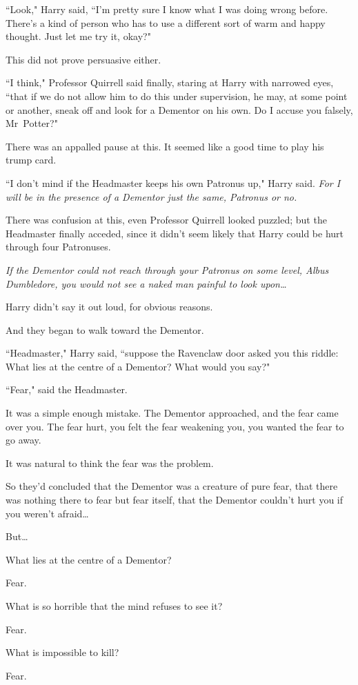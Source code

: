 ``Look," Harry said, ``I'm pretty sure I know what I was doing wrong before. There's a kind of person who has to use a different sort of warm and happy thought. Just let me try it, okay?"

This did not prove persuasive either.

``I think," Professor Quirrell said finally, staring at Harry with narrowed eyes, ``that if we do not allow him to do this under supervision, he may, at some point or another, sneak off and look for a Dementor on his own. Do I accuse you falsely, Mr~Potter?"

There was an appalled pause at this. It seemed like a good time to play his trump card.

``I don't mind if the Headmaster keeps his own Patronus up," Harry said. \emph{For I will be in the presence of a Dementor just the same, Patronus or no.}

There was confusion at this, even Professor Quirrell looked puzzled; but the Headmaster finally acceded, since it didn't seem likely that Harry could be hurt through four Patronuses.

\emph{If the Dementor could not reach through your Patronus on some level, Albus Dumbledore, you would not see a naked man painful to look upon{\ldots}}

Harry didn't say it out loud, for obvious reasons.

And they began to walk toward the Dementor.

``Headmaster," Harry said, ``suppose the Ravenclaw door asked you this riddle: What lies at the centre of a Dementor? What would you say?"

``Fear," said the Headmaster.

It was a simple enough mistake. The Dementor approached, and the fear came over you. The fear hurt, you felt the fear weakening you, you wanted the fear to go away.

It was natural to think the fear was the problem.

So they'd concluded that the Dementor was a creature of pure fear, that there was nothing there to fear but fear itself, that the Dementor couldn't hurt you if you weren't afraid{\ldots}

But{\ldots}

\begin{em}
What lies at the centre of a Dementor?

Fear.

What is so horrible that the mind refuses to see it?

Fear.

What is impossible to kill?

Fear.
\end{em}

